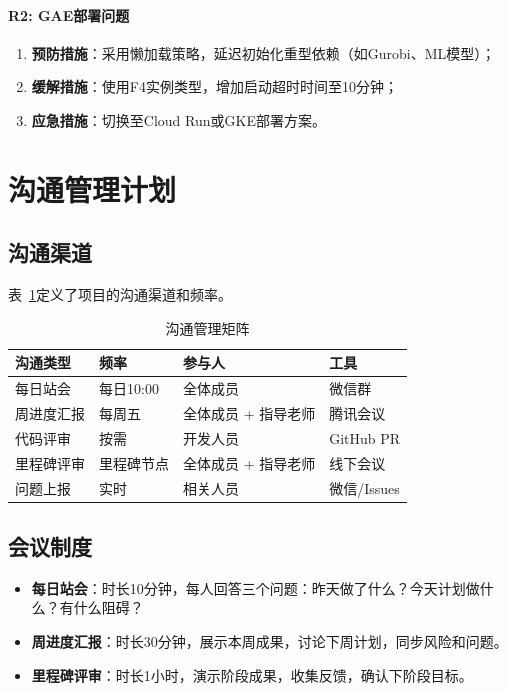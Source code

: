 \paragraph{R2: GAE部署问题}
\begin{enumerate}
    \item \textbf{预防措施}：采用懒加载策略，延迟初始化重型依赖（如Gurobi、ML模型）；
    \item \textbf{缓解措施}：使用F4实例类型，增加启动超时时间至10分钟；
    \item \textbf{应急措施}：切换至Cloud Run或GKE部署方案。
\end{enumerate}

\section{沟通管理计划}

\subsection{沟通渠道}

表~\ref{tab:communication}定义了项目的沟通渠道和频率。

\begin{table}[htbp]
    \centering
    \caption{沟通管理矩阵}
    \label{tab:communication}
    \begin{tabular}{llll}
        \toprule
        \textbf{沟通类型} & \textbf{频率} & \textbf{参与人} & \textbf{工具} \\
        \midrule
        每日站会          & 每日10:00     & 全体成员         & 微信群         \\
        周进度汇报         & 每周五         & 全体成员 + 指导老师  & 腾讯会议        \\
        代码评审          & 按需          & 开发人员         & GitHub PR   \\
        里程碑评审         & 里程碑节点       & 全体成员 + 指导老师  & 线下会议        \\
        问题上报          & 实时          & 相关人员         & 微信/Issues   \\
        \bottomrule
    \end{tabular}
\end{table}

\subsection{会议制度}

\begin{itemize}
    \item \textbf{每日站会}：时长10分钟，每人回答三个问题：昨天做了什么？今天计划做什么？有什么阻碍？
    \item \textbf{周进度汇报}：时长30分钟，展示本周成果，讨论下周计划，同步风险和问题。
    \item \textbf{里程碑评审}：时长1小时，演示阶段成果，收集反馈，确认下阶段目标。
\end{itemize}